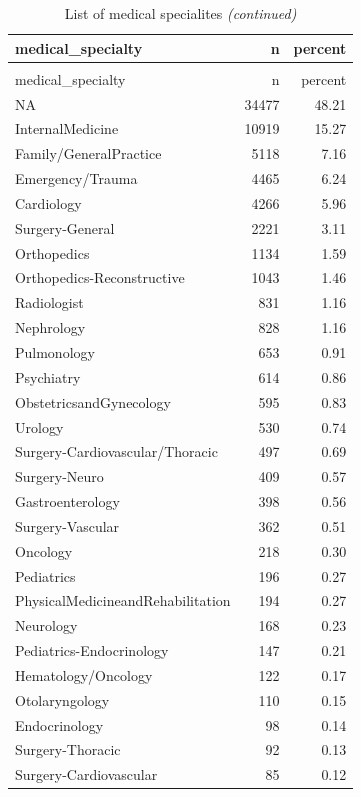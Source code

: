 \documentclass[
]{article}
\begin{document}
\begin{longtable}[t]{lrr}
\caption{\label{tab:unnamed-chunk-22}List of medical specialites}\\
\toprule
medical\_specialty & n & percent\\
\midrule
\endfirsthead
\caption[]{List of medical specialites \textit{(continued)}}\\
\toprule
medical\_specialty & n & percent\\
\midrule
\endhead

\endfoot
\bottomrule
\endlastfoot
NA & 34477 & 48.21\\
InternalMedicine & 10919 & 15.27\\
Family/GeneralPractice & 5118 & 7.16\\
Emergency/Trauma & 4465 & 6.24\\
Cardiology & 4266 & 5.96\\
\addlinespace
Surgery-General & 2221 & 3.11\\
Orthopedics & 1134 & 1.59\\
Orthopedics-Reconstructive & 1043 & 1.46\\
Radiologist & 831 & 1.16\\
Nephrology & 828 & 1.16\\
\addlinespace
Pulmonology & 653 & 0.91\\
Psychiatry & 614 & 0.86\\
ObstetricsandGynecology & 595 & 0.83\\
Urology & 530 & 0.74\\
Surgery-Cardiovascular/Thoracic & 497 & 0.69\\
\addlinespace
Surgery-Neuro & 409 & 0.57\\
Gastroenterology & 398 & 0.56\\
Surgery-Vascular & 362 & 0.51\\
Oncology & 218 & 0.30\\
Pediatrics & 196 & 0.27\\
\addlinespace
PhysicalMedicineandRehabilitation & 194 & 0.27\\
Neurology & 168 & 0.23\\
Pediatrics-Endocrinology & 147 & 0.21\\
Hematology/Oncology & 122 & 0.17\\
Otolaryngology & 110 & 0.15\\
\addlinespace
Endocrinology & 98 & 0.14\\
Surgery-Thoracic & 92 & 0.13\\
Surgery-Cardiovascular & 85 & 0.12\\

\end{longtable}
\end{document}
